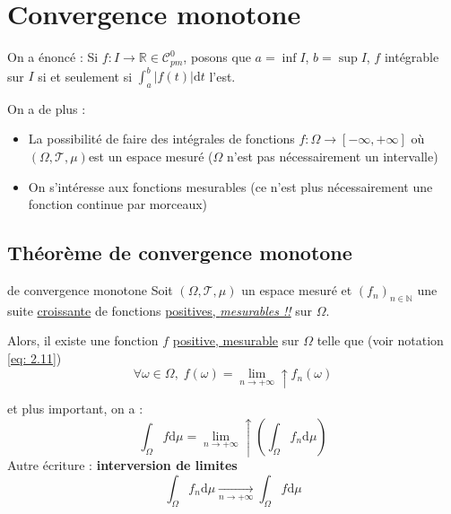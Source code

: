 
\newpage
\section{Convergence monotone} %
\label{sec:Convergence monotone}




On a énoncé : Si $f : I \to \mathbb{R} \in \mathcal{C}_{pm} ^{0}$, posons que $a = \inf I$, $b = \sup I$, $f$ intégrable sur $I$ si et seulement si $\int_{a}^{b} |f(t) | \mathrm{d}t$ l'est.

On a de plus : 
\begin{itemize}

  \item La possibilité  de faire des intégrales de fonctions $f : \Omega \to [- \infty, + \infty]$ où $(\Omega, \mathcal{T}, \mu)$est un espace mesuré ($\Omega$ n'est pas nécessairement un intervalle)

  \item On s'intéresse aux fonctions mesurables (ce n'est plus nécessairement une fonction continue par morceaux)

\end{itemize}

\subsection{Théorème de convergence monotone} %
\label{sub:Théorème de convergence monotone}


\begin{Theorem}{de convergence monotone}{}
  Soit $(\Omega, \mathcal{T}, \mu)$ un espace mesuré et $(f_n ) _{n \in \mathbb{N}}$ une suite \underline{croissante} de fonctions \underline{{\color{red}positives, \textit{mesurables !!}}} sur $\Omega$. 

Alors, il existe une fonction $f$ \underline{positive, mesurable} sur $\Omega$ telle que  (voir notation \ref{eq: 2.11})
\begin{equation}
  \forall \omega \in \Omega, \; f(\omega) = \underset{n \to + \infty}{\lim}\uparrow f_n(\omega)
\end{equation}

et plus important, on a : 
\begin{equation}
  \boxed{\int_{\Omega}^{} f \mathrm{d}\mu = \underset{n \to + \infty}{\lim} \uparrow \left( \int_{\Omega}^{} f_n \mathrm{d}\mu \right)}
\end{equation}
Autre écriture : \textbf{interversion de limites}
\begin{equation}
\int_{\Omega}^{} f_n \mathrm{d} \mu  \underset{n \to + \infty}{\longrightarrow} \int_{\Omega}^{} f \mathrm{d}\mu
\end{equation}
\end{Theorem}

